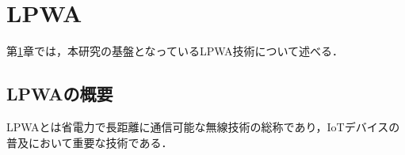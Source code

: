 \chapter{LPWA}\label{chap: LPWA}
第\ref{chap: LPWA}章では，本研究の基盤となっているLPWA技術について述べる．

\section{LPWAの概要}
    LPWAとは省電力で長距離に通信可能な無線技術の総称であり，IoTデバイスの普及において重要な技術である．

